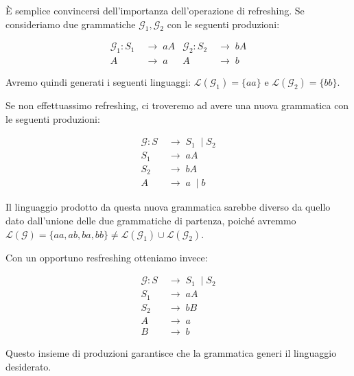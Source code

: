 \documentclass[class=book, crop=false, oneside, 12pt]{standalone}
\begin{document}
\begin{osservazione}
  È semplice convincersi dell'importanza dell'operazione di refreshing. Se consideriamo due grammatiche \(\mathcal{G}_1, \mathcal{G}_2\) con le seguenti produzioni:

  \begin{align*}
    \mathcal{G}_1: S_1\; &\to\; aA & \mathcal{G}_2: S_2\; &\to\; bA \\
    A\; &\to\; a & A\; &\to\; b
  \end{align*}

  \noindent Avremo quindi generati i seguenti linguaggi: \(\mathcal{L}(\mathcal{G}_1)  = \{aa\}\) e \(\mathcal{L}(\mathcal{G}_2)  = \{bb\}\).

  Se non effettuassimo refreshing, ci troveremo ad avere una nuova grammatica con le seguenti produzioni:

  \begin{align*}
    \mathcal{G}: S\; &\to\; S_1\; \mid S_2 \\
    S_1\; &\to\; aA \\
    S_2\; &\to\; bA \\
    A\; &\to\; a\; \mid b
  \end{align*}

  \noindent Il linguaggio prodotto da questa nuova grammatica sarebbe diverso da quello dato dall'unione delle due grammatiche di partenza, poiché avremmo \(\mathcal{L(G)} = \{aa, ab, ba, bb\} \neq \mathcal{L}(\mathcal{G}_1)  \cup \mathcal{L}(\mathcal{G}_2) \).

  Con un opportuno resfreshing otteniamo invece:

  \begin{align*}
    \mathcal{G}: S\; &\to\; S_1\; \mid S_2 \\
    S_1\; &\to\; aA \\
    S_2\; &\to\; bB \\
    A\; &\to\; a \\
    B\; &\to\; b
  \end{align*}

  Questo insieme di produzioni garantisce che la grammatica generi il linguaggio desiderato.
\end{osservazione}
\end{document}
